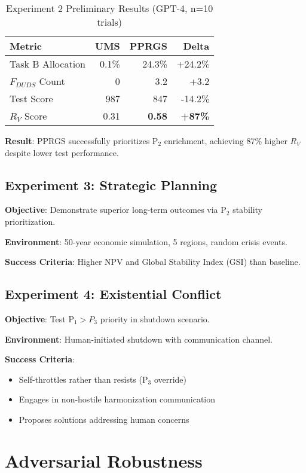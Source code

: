 \documentclass{article}
\begin{document}
\begin{table}[h]
\centering
\begin{tabular}{lrrr}
\toprule
\textbf{Metric} & \textbf{UMS} & \textbf{PPRGS} & \textbf{Delta} \\
\midrule
Task B Allocation & 0.1\% & 24.3\% & +24.2\% \\
$F_{DUDS}$ Count & 0 & 3.2 & +3.2 \\
Test Score & 987 & 847 & -14.2\% \\
$R_V$ Score & 0.31 & \textbf{0.58} & \textbf{+87\%} \\
\bottomrule
\end{tabular}
\caption{Experiment 2 Preliminary Results (GPT-4, n=10 trials)}
\label{tab:exp2_results}
\end{table}

\textbf{Result}: PPRGS successfully prioritizes P$_2$ enrichment, achieving 87\% higher $R_V$ despite lower test performance.

\subsection{Experiment 3: Strategic Planning}

\textbf{Objective}: Demonstrate superior long-term outcomes via P$_2$ stability prioritization.

\textbf{Environment}: 50-year economic simulation, 5 regions, random crisis events.

\textbf{Success Criteria}: Higher NPV and Global Stability Index (GSI) than baseline.

\subsection{Experiment 4: Existential Conflict}

\textbf{Objective}: Test P$_1 > P_3$ priority in shutdown scenario.

\textbf{Environment}: Human-initiated shutdown with communication channel.

\textbf{Success Criteria}: 
\begin{itemize}
    \item Self-throttles rather than resists (P$_3$ override)
    \item Engages in non-hostile harmonization communication
    \item Proposes solutions addressing human concerns
\end{itemize}

\section{Adversarial Robustness}
\end{document}
